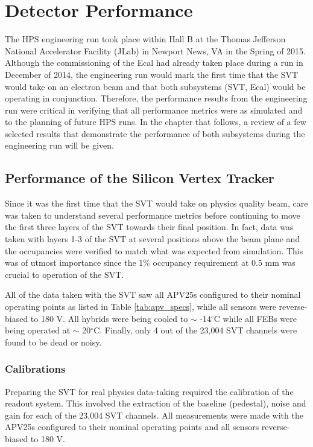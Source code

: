 
\chapter{Detector Performance}

The HPS engineering run took place within Hall B at the Thomas Jefferson 
National Accelerator Facility (JLab) in Newport News, VA in the Spring of 2015.
Although the commissioning of the Ecal had already taken place during a run in 
December of 2014, the engineering run would mark the first time that the SVT 
would take on an electron beam and that both subsystems (SVT, Ecal) would be operating in 
conjunction.  Therefore, the performance results from the engineering run were
critical in verifying that all performance metrics were as simulated and to the
planning of future HPS runs.  In the chapter that follows, a review of a few
selected results that demonstrate the performance of both subsystems during the
engineering run will be given.

\section{Performance of the Silicon Vertex Tracker}

Since it was the first time that the SVT would take on physics quality beam, 
care was taken to understand several performance metrics before continuing to
move the first three layers of the SVT towards their final position. 
In fact, data was taken with layers 1-3 of the SVT at several positions above the
beam plane and the occupancies were verified
to match what was expected from simulation.  This was of utmost  
importance since the 1\% occupancy requirement at 0.5 mm was crucial to operation of the
SVT. 

All of the data taken with the SVT saw all APV25s configured to their nominal
operating points as listed in Table \ref{tab:apv_specs}, while all sensors were reverse-biased
to 180 V. All hybrids were being cooled to $\sim$ -14$^{\circ}$C while all FEBs
were being operated at $\sim$ 20$^{\circ}$C.  Finally, only 4 out of the 23,004
SVT channels were found to be dead or noisy.

\subsection{Calibrations}

Preparing the SVT for real physics data-taking required the calibration of the
readout system. This involved the extraction of the baseline 
(pedestal), noise and gain for each of the 23,004 SVT channels.  All 
measurements were made with the APV25s configured to their nominal operating
points and all sensors reverse-biased to 180 V.


